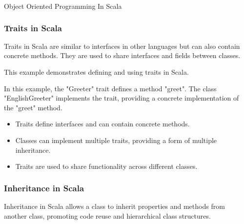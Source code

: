 \begin{notes}{Object Oriented Programming In Scala}
\begin{highlight}
    \end{highlight}
    
    \subsubsection*{Traits in Scala}
    
    Traits in Scala are similar to interfaces in other languages but can also contain concrete methods. They are used to share interfaces and fields between classes.
    
    \begin{highlight}
    
        This example demonstrates defining and using traits in Scala.
    
    
        In this example, the "Greeter" trait defines a method "greet". The class "EnglishGreeter" implements the trait, providing a concrete implementation of the "greet" method.
    
        \begin{itemize}
            \item Traits define interfaces and can contain concrete methods.
            \item Classes can implement multiple traits, providing a form of multiple inheritance.
            \item Traits are used to share functionality across different classes.
        \end{itemize}
    
    \end{highlight}
    
    \subsubsection*{Inheritance in Scala}
    
    Inheritance in Scala allows a class to inherit properties and methods from another class, promoting code reuse and hierarchical class structures.
    

\end{notes}
